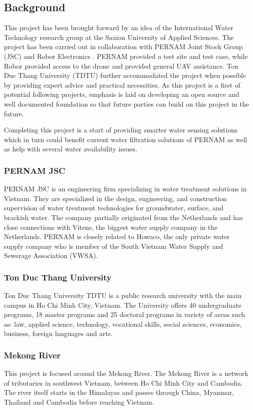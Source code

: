 \subsection{Background}
This project has been brought forward by an idea of the International Water Technology research group at the Saxion University of Applied Sciences. The project has been carried out in collaboration with PERNAM Joint Stock Group (\gls{JSC}) and Robor Electronics \cite{robor}. PERNAM provided a test site and test case, while Robor provided access to the drone and provided general UAV assistance. Ton Duc Thang University (\gls{TDTU}) further accommodated the project when possible by providing expert advice and practical necessities. As this project is a first of potential following projects, emphasis is laid on developing an open source and well documented foundation so that future parties can build on this project in the future. 

Completing this project is a start of providing smarter water sensing solutions which in turn could benefit current water filtration solutions of PERNAM as well as help with several water availability issues.

\subsubsection{PERNAM JSC}
PERNAM \gls{JSC} \cite{pernam} is an engineering firm specializing in water treatment solutions in Vietnam. They are specialized in the design, engineering, and construction supervision of water treatment technologies for groundwater, surface, and brackish water. The company partially originated from the Netherlands and has close connections with Vitens, the biggest water supply company in the Netherlands. PERNAM is closely related to Howaco, the only private water supply company who is member of the South Vietnam Water Supply and Sewerage Association (\gls{VWSA}).

\subsubsection{Ton Duc Thang University}
Ton Duc Thang University \gls{TDTU} \cite{tdtu} is a public research university with the main campus in Ho Chi Minh City, Vietnam. The University offers 40 undergraduate programs, 18 master programs and 25 doctoral programs in variety of areas such as: law, applied science, technology, vocational skills, social sciences, economics, business, foreign languages and arts. 
\newpage
\subsubsection{Mekong River}
This project is focused around the Mekong River. The Mekong River is a network of tributaries in southwest Vietnam, between Ho Chi Minh City and Cambodia. The river itself starts in the Himalayas and passes through China, Myanmar, Thailand and Cambodia before reaching Vietnam.

